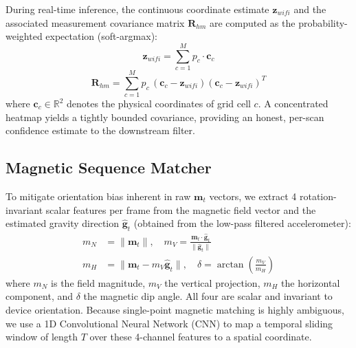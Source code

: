 \documentclass[conference]{IEEEtran}
\begin{document}
During real-time inference, the continuous coordinate estimate $\mathbf{z}_{wifi}$ and the associated measurement covariance matrix $\mathbf{R}_{hm}$ are computed as the probability-weighted expectation (soft-argmax):
\begin{equation}
\mathbf{z}_{wifi} = \sum_{c=1}^{M} p_c \cdot \mathbf{c}_c \label{eq:heatmap_centroid}
\end{equation}
\begin{equation}
\mathbf{R}_{hm} = \sum_{c=1}^{M} p_c\,(\mathbf{c}_c - \mathbf{z}_{wifi})(\mathbf{c}_c - \mathbf{z}_{wifi})^T \label{eq:heatmap_cov}
\end{equation}
where $\mathbf{c}_c \in \mathbb{R}^2$ denotes the physical coordinates of grid cell $c$. A concentrated heatmap yields a tightly bounded covariance, providing an honest, per-scan confidence estimate to the downstream filter.

\subsection{Magnetic Sequence Matcher}

To mitigate orientation bias inherent in raw $\mathbf{m}_t$ vectors, we extract 4 rotation-invariant scalar features per frame from the magnetic field vector and the estimated gravity direction $\hat{\mathbf{g}}_t$ (obtained from the low-pass filtered accelerometer):
\begin{align}
m_N &= \|\mathbf{m}_t\|, \quad m_V = \frac{\mathbf{m}_t \cdot \hat{\mathbf{g}}_t}{\|\hat{\mathbf{g}}_t\|} \nonumber \\
m_H &= \|\mathbf{m}_t - m_V \hat{\mathbf{g}}_t\|, \quad \delta = \arctan\!\left(\frac{m_V}{m_H}\right) \label{eq:mag_features}
\end{align}
where $m_N$ is the field magnitude, $m_V$ the vertical projection, $m_H$ the horizontal component, and $\delta$ the magnetic dip angle. All four are scalar and invariant to device orientation. Because single-point magnetic matching is highly ambiguous, we use a 1D Convolutional Neural Network (CNN) to map a temporal sliding window of length $T$ over these 4-channel features to a spatial coordinate.
\end{document}
